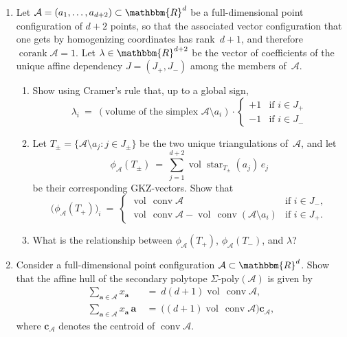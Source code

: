\documentclass[11pt]{amsart}
\newcommand{\cA}{\mathcal{A}}
\DeclareMathOperator{\conv}{conv}
\DeclareMathOperator{\thestar}{star}
\DeclareMathOperator{\corank}{corank}
\DeclareMathOperator{\vol}{vol}
\newcommand{\RR}{\mathbbm{R}}
\newcommand{\aaa}{\mathbf{a}}
\begin{document}
\bigskip
\begin{enumerate}

\item
  Let $\cA=(a_1,\dots,a_{d+2})\subset\RR^d$ be a full-dimensional point configuration of $d+2$ points,
  so that the associated vector configuration that one gets by homogenizing coordinates has rank~$d+1$, and therefore $\corank\cA=1$.
  Let $\lambda\in\RR^{d+2}$ be the vector of coefficients of the unique affine dependency $J=(J_+,J_-)$ among the members of~$\cA$.
  \begin{enumerate}
  \item Show using Cramer's rule that, up to a global sign,
    \[
      \lambda_i
      \ = \
      (\text{volume of the simplex $\cA\setminus a_i$})\cdot
      \begin{cases}
        +1
        &
        \text{if } i \in J_+
        \\
        -1
        &
        \text{if } i \in J_-        
      \end{cases}
    \]

  \item 
    Let $T_\pm=\{\cA\setminus a_j:j\in J_\pm\}$ be the two unique triangulations of~$\cA$,
    and let
    \[
      \phi_{\cA}(T_\pm)
      \ = \
      \sum_{j=1}^{d+2}\vol\thestar_{T_\pm}(a_j)\,e_j
    \]
    be their corresponding GKZ-vectors. Show that
    \[
      \big(\phi_{\cA}(T_+)\big)_i
      \ = \
      \begin{cases}
        \vol\,\conv\cA
        &
        \text{if } i\in J_-,
        \\
        \vol\,\conv\cA - \vol\,\conv(\cA\setminus a_i)
        &
        \text{if } i\in J_+.        
      \end{cases}
    \]

  \item
    What is the relationship between $\phi_\cA(T_+)$, $\phi_\cA(T_-)$, and $\lambda$?
  \end{enumerate}

  \bigskip

\item
  Consider a full-dimensional point configuration $\cA\subset\RR^d$.
  Show that the affine hull of the secondary polytope $\Sigma$-poly$(\cA)$ is given by
  \begin{align*}
    \sum_{\aaa\in\cA} x_\aaa \
    &= \
      d(d+1)\vol\,\conv\cA,
    \\
    \sum_{\aaa\in\cA} x_\aaa\,\aaa \
    &= \
      \big((d+1)\vol\,\conv\cA\big)\mathbf{c}_\cA,
  \end{align*}
  where $\mathbf{c}_\cA$ denotes the centroid of $\conv\cA$.


\end{enumerate}
\end{document}

